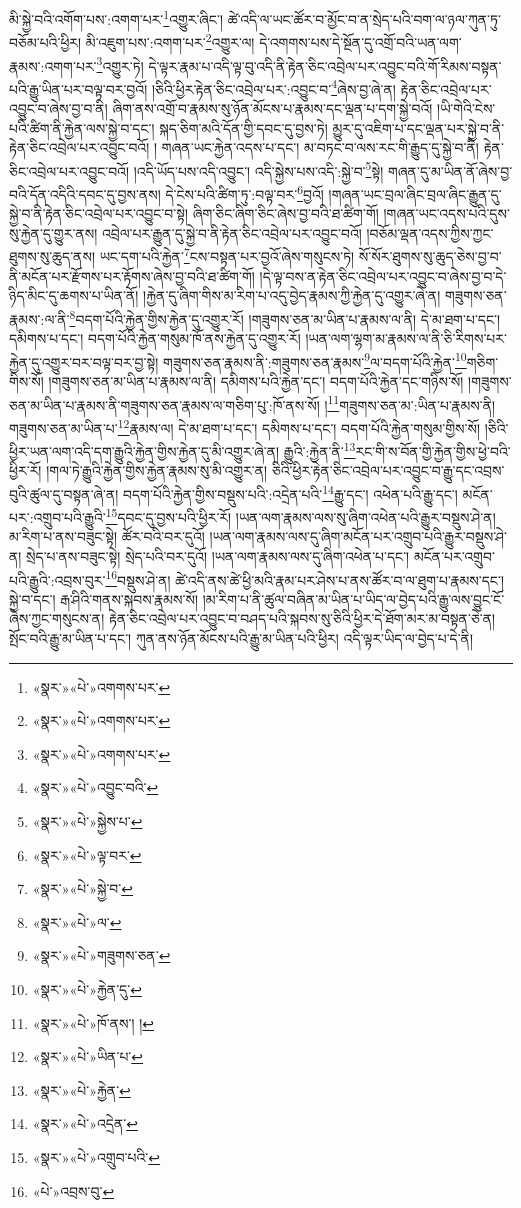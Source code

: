 མི་སྐྱེ་བའི་འགོག་པས་:འགག་པར་\footnote{«སྣར་»«པེ་»འགགས་པར་}འགྱུར་ཞིང་། ཚེ་འདི་ལ་ཡང་ཚོར་བ་མྱོང་བ་ན་སྲེད་པའི་བག་ལ་ཉལ་ཀུན་ཏུ་བཅོམ་པའི་ཕྱིར། མི་འཇུག་པས་:འགག་པར་\footnote{«སྣར་»«པེ་»འགགས་པར་}འགྱུར་ལ། དེ་འགགས་པས་དེ་སྔོན་དུ་འགྲོ་བའི་ཡན་ལག་རྣམས་:འགག་པར་\footnote{«སྣར་»«པེ་»འགགས་པར་}འགྱུར་ཏེ། དེ་ལྟར་རྣམ་པ་འདི་ལྟ་བུ་འདི་ནི་རྟེན་ཅིང་འབྲེལ་པར་འབྱུང་བའི་གོ་རིམས་བསྟན་པའི་རྒྱུ་ཡིན་པར་བལྟ་བར་བྱའོ། །ཅིའི་ཕྱིར་རྟེན་ཅིང་འབྲེལ་པར་:འབྱུང་བ་\footnote{«སྣར་»«པེ་»འབྱུང་བའི་}ཞེས་བྱ་ཞེ་ན། རྟེན་ཅིང་འབྲེལ་པར་འབྱུང་བ་ཞེས་བྱ་བ་ནི། ཞིག་ནས་འགྲོ་བ་རྣམས་སུ་ཉོན་མོངས་པ་རྣམས་དང་ལྡན་པ་དག་སྐྱེ་བའོ། །ཡི་གེའི་ངེས་པའི་ཚིག་ནི་རྐྱེན་ལས་སྐྱེ་བ་དང་། སྐད་ཅིག་མའི་དོན་གྱི་དབང་དུ་བྱས་ཏེ། མྱུར་དུ་འཇིག་པ་དང་ལྡན་པར་སྐྱེ་བ་ནི་རྟེན་ཅིང་འབྲེལ་པར་འབྱུང་བའོ། །
གཞན་ཡང་རྐྱེན་འདས་པ་དང་། མ་བཏང་བ་ལས་རང་གི་རྒྱུད་དུ་སྐྱེ་བ་ནི། རྟེན་ཅིང་འབྲེལ་པར་འབྱུང་བའོ། །འདི་ཡོད་པས་འདི་འབྱུང་། འདི་སྐྱེས་པས་འདི་:སྐྱེ་བ་\footnote{«སྣར་»«པེ་»སྐྱེས་པ་}སྟེ། གཞན་དུ་མ་ཡིན་ནོ་ཞེས་བྱ་བའི་དོན་འདིའི་དབང་དུ་བྱས་ནས། དེ་ངེས་པའི་ཚིག་ཏུ་:བལྟ་བར་\footnote{«སྣར་»«པེ་»ལྟ་བར་}བྱའོ། །གཞན་ཡང་བྲལ་ཞིང་བྲལ་ཞིང་རྒྱུན་དུ་སྐྱེ་བ་ནི་རྟེན་ཅིང་འབྲེལ་པར་འབྱུང་བ་སྟེ། ཞིག་ཅིང་ཞིག་ཅིང་ཞེས་བྱ་བའི་ཐ་ཚིག་གོ། །གཞན་ཡང་འདས་པའི་དུས་སུ་རྐྱེན་དུ་གྱུར་ནས། འབྲེལ་པར་རྒྱུན་དུ་སྐྱེ་བ་ནི་རྟེན་ཅིང་འབྲེལ་པར་འབྱུང་བའོ། །བཅོམ་ལྡན་འདས་ཀྱིས་ཀྱང་ཐུགས་སུ་ཆུད་ནས། ཡང་དག་པའི་རྐྱེན་\footnote{«སྣར་»«པེ་»སྐྱེ་བ་}ངས་བསྟན་པར་བྱའོ་ཞེས་གསུངས་ཏེ། སོ་སོར་ཐུགས་སུ་ཆུད་ཅེས་བྱ་བ་ནི་མངོན་པར་རྫོགས་པར་རྟོགས་ཞེས་བྱ་བའི་ཐ་ཚིག་གོ། །དེ་ལྟ་བས་ན་རྟེན་ཅིང་འབྲེལ་པར་འབྱུང་བ་ཞེས་བྱ་བ་དེ་ཉིད་མིང་དུ་ཆགས་པ་ཡིན་ནོ། །རྐྱེན་དུ་ཞིག་གིས་མ་རིག་པ་འདུ་བྱེད་རྣམས་ཀྱི་རྐྱེན་དུ་འགྱུར་ཞེ་ན། གཟུགས་ཅན་རྣམས་:ལ་ནི་\footnote{«སྣར་»«པེ་»ལ་}བདག་པོའི་རྐྱེན་གྱིས་རྐྱེན་དུ་འགྱུར་རོ། །གཟུགས་ཅན་མ་ཡིན་པ་རྣམས་ལ་ནི། དེ་མ་ཐག་པ་དང་། དམིགས་པ་དང་། བདག་པོའི་རྐྱེན་གསུམ་ཁོ་ནས་རྐྱེན་དུ་འགྱུར་རོ། །ཡན་ལག་ལྷག་མ་རྣམས་ལ་ནི་ཅི་རིགས་པར་རྐྱེན་དུ་འགྱུར་བར་བལྟ་བར་བྱ་སྟེ། གཟུགས་ཅན་རྣམས་ནི་:གཟུགས་ཅན་རྣམས་\footnote{«སྣར་»«པེ་»གཟུགས་ཅན་}ལ་བདག་པོའི་རྐྱེན་\footnote{«སྣར་»«པེ་»རྐྱེན་དུ་}གཅིག་གིས་སོ། །གཟུགས་ཅན་མ་ཡིན་པ་རྣམས་ལ་ནི། དམིགས་པའི་རྐྱེན་དང་། བདག་པོའི་རྐྱེན་དང་གཉིས་སོ། །གཟུགས་ཅན་མ་ཡིན་པ་རྣམས་ནི་གཟུགས་ཅན་རྣམས་ལ་གཅིག་པུ་:ཁོ་ནས་སོ། །\footnote{«སྣར་»«པེ་»ཁོ་ནས་། ། }གཟུགས་ཅན་མ་:ཡིན་པ་རྣམས་ནི། གཟུགས་ཅན་མ་ཡིན་པ་\footnote{«སྣར་»«པེ་»ཡིན་པ་}རྣམས་ལ། དེ་མ་ཐག་པ་དང་། དམིགས་པ་དང་། བདག་པོའི་རྐྱེན་གསུམ་གྱིས་སོ། །ཅིའི་ཕྱིར་ཡན་ལག་འདི་དག་རྒྱུའི་རྐྱེན་གྱིས་རྐྱེན་དུ་མི་འགྱུར་ཞེ་ན། རྒྱུའི་:རྐྱེན་ནི་\footnote{«སྣར་»«པེ་»རྐྱེན་}རང་གི་ས་བོན་གྱི་རྐྱེན་གྱིས་ཕྱེ་བའི་ཕྱིར་རོ། །གལ་ཏེ་རྒྱུའི་རྐྱེན་གྱིས་རྐྱེན་རྣམས་སུ་མི་འགྱུར་ན། ཅིའི་ཕྱིར་རྟེན་ཅིང་འབྲེལ་པར་འབྱུང་བ་རྒྱུ་དང་འབྲས་བུའི་ཚུལ་དུ་བསྟན་ཞེ་ན། བདག་པོའི་རྐྱེན་གྱིས་བསྡུས་པའི་:འདྲེན་པའི་\footnote{«སྣར་»«པེ་»འདྲེན་}རྒྱུ་དང་། འཕེན་པའི་རྒྱུ་དང་། མངོན་པར་:འགྲུབ་པའི་རྒྱུའི་\footnote{«སྣར་»«པེ་»འགྲུབ་པའི་}དབང་དུ་བྱས་པའི་ཕྱིར་རོ། །ཡན་ལག་རྣམས་ལས་སུ་ཞིག་འཕེན་པའི་རྒྱུར་བསྡུས་ཤེ་ན། མ་རིག་པ་ནས་བཟུང་སྟེ། ཚོར་བའི་བར་དུའོ། །ཡན་ལག་རྣམས་ལས་དུ་ཞིག་མངོན་པར་འགྲུབ་པའི་རྒྱུར་བསྡུས་ཤེ་ན། སྲེད་པ་ནས་བཟུང་སྟེ། སྲེད་པའི་བར་དུའོ། །ཡན་ལག་རྣམས་ལས་དུ་ཞིག་འཕེན་པ་དང་། མངོན་པར་འགྲུབ་པའི་རྒྱུའི་:འབྲས་བུར་\footnote{«པེ་»འབྲས་བུ་}བསྡུས་ཤེ་ན། ཚེ་འདི་ནས་ཚེ་ཕྱི་མའི་རྣམ་པར་ཤེས་པ་ནས་ཚོར་བ་ལ་ཐུག་པ་རྣམས་དང་། སྐྱེ་བ་དང་། རྒ་ཤིའི་གནས་སྐབས་རྣམས་སོ། །མ་རིག་པ་ནི་ཚུལ་བཞིན་མ་ཡིན་པ་ཡིད་ལ་བྱེད་པའི་རྒྱུ་ལས་བྱུང་ངོ་ཞེས་ཀྱང་གསུངས་ན། རྟེན་ཅིང་འབྲེལ་པར་འབྱུང་བ་བཤད་པའི་སྐབས་སུ་ཅིའི་ཕྱིར་དེ་ཐོག་མར་མ་བསྟན་ཅེ་ན། སྤོང་བའི་རྒྱུ་མ་ཡིན་པ་དང་། ཀུན་ནས་ཉོན་མོངས་པའི་རྒྱུ་མ་ཡིན་པའི་ཕྱིར། འདི་ལྟར་ཡིད་ལ་བྱེད་པ་དེ་ནི། 
